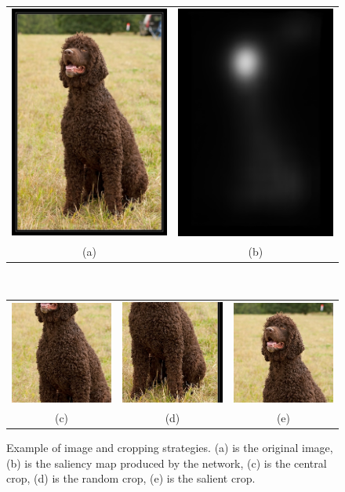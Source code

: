\documentclass[12pt]{article}
\begin{document}
\begin{figure}
\scriptsize
\begin{center}
    \begin{tabular} {cc}
    \includegraphics[width=0.25\linewidth]{./img/crops/5-raw.JPEG} &
    \includegraphics[width=0.25\linewidth]{./img/crops/5-sals.png} \\
    (a) & (b) \\
    \end{tabular}\\
    \begin{tabular} {ccc}
    \includegraphics[width=0.2\linewidth]{./img/crops/5-central.JPEG} &
    \includegraphics[width=0.2\linewidth]{./img/crops/5-rand.JPEG} &
    \includegraphics[width=0.2\linewidth]{./img/crops/5-soft.JPEG} \\
    (c) & (d) & (e)\\
    \end{tabular}
\caption{\small Example of image and cropping strategies.
    (a) is the original image, (b) is the saliency map produced by the network,
    (c) is the central crop, (d) is the random crop, (e) is the salient crop.}
\label{fig:exp1}
\end{center}
\end{figure}
\end{document}
